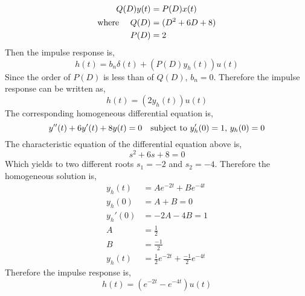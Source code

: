 \documentclass[10pt,a4paper, margin=1in]{article}
\begin{document}
\begin{enumerate}
\begin{enumerate}
\begin{equation}
\begin{split}
	Q(D)y(t) & = P(D)x(t)  \\
\text{where \quad} Q(D) & = (D^2 + 6D + 8) \\
	P(D) & = 2
	\end{split}
	\end{equation}
	Then the impulse response is,
	\begin{equation}
	h(t) = b_n\delta(t)+(P(D)y_h(t))u(t)
	\end{equation}
	Since the order of $P(D)$ is less than of $Q(D)$, $b_n=0$. Therefore the impulse response can be written as,
	\begin{equation}
	h(t)=(2y_h(t))u(t)
	\end{equation}
	The corresponding homogeneous differential equation is,
	\begin{equation}
	y''(t)+6y'(t)+8y(t)=0 \text{\quad subject to } y_h'(0)=1 \text{, } y_h(0)=0
	\end{equation}
	The characteristic equation of the differential equation above is,
	\begin{equation}
	s^2 + 6s + 8 = 0
	\end{equation}
	Which yields to two different roots $s_1=-2$ and $s_2=-4$. Therefore the homogeneous solution is,
	\begin{equation}
	\begin{split}
	y_h(t) & = Ae^{-2t}+Be^{-4t} \\
	y_h(0) & = A +B = 0 \\
	y_h'(0) &= -2A -4B = 1 \\
	A & = \frac{1}{2}\\
	B & = \frac{-1}{2}\\
	y_h(t) & =  \frac{1}{2}e^{-2t}+\frac{-1}{2}e^{-4t} 
	\end{split}
	\end{equation}
	Therefore the impulse response is,
	\begin{equation}
	h(t) = (e^{-2t}-e^{-4t})u(t)
	\end{equation} \\


\end{enumerate}
\end{enumerate}
\end{document}
